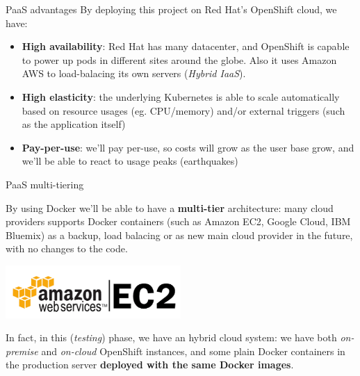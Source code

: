 \begin{frame}{PaaS advantages}
By deploying this project on Red Hat's OpenShift cloud, we have:

\begin{itemize}
  \item \textbf{High availability}: Red Hat has many datacenter, and OpenShift
  is capable to power up pods in different sites around the globe. Also it uses
	Amazon AWS to load-balacing its own servers (\textit{Hybrid IaaS}).
  \item \textbf{High elasticity}: the underlying Kubernetes is able to scale
  automatically based on resource usages (eg. CPU/memory) and/or external
	triggers (such as the application itself)
	\item \textbf{Pay-per-use}: we'll pay per-use, so costs will grow as the user
	base grow, and we'll be able to react to usage peaks (earthquakes)
\end{itemize}
\end{frame}




\begin{frame}{PaaS multi-tiering}

By using Docker we'll be able to have a \textbf{multi-tier} architecture:
many cloud providers supports Docker containers (such as Amazon EC2, Google
Cloud, IBM Bluemix) as a backup, load balacing or as new main cloud provider in
the future, with no changes to the code.

\begin{center}
\includegraphics[width=0.5\textwidth]{amazon_ec2}
\end{center}


In fact, in this (\textit{testing}) phase, we have an hybrid cloud system:
we have both \textit{on-premise} and \textit{on-cloud} OpenShift instances, and
some plain Docker containers in the production server \textbf{deployed with the
same Docker images}.

\end{frame}



